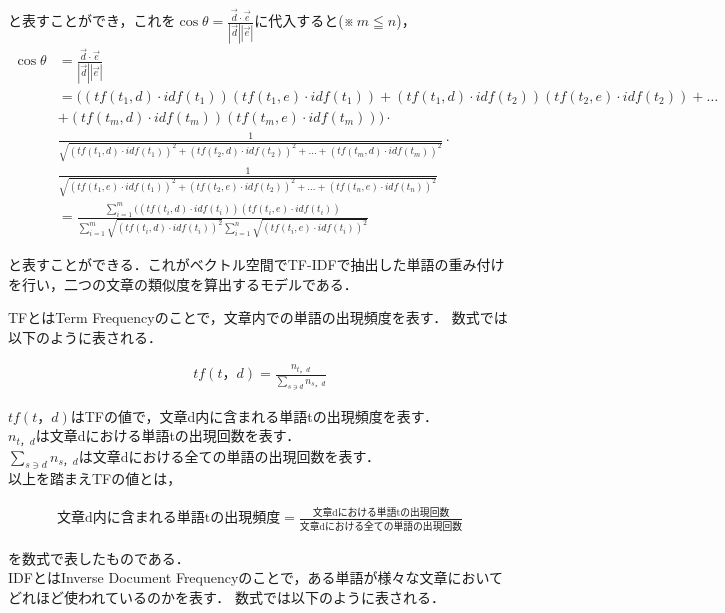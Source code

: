 と表すことができ，これを$ \cos \theta = \frac{\vec{d} \cdot \vec{e}}{|\vec{d}| |\vec{e}|} $に代入すると(※\,$ m \leqq n $)，
\begin{align}
\cos \theta &= \frac{\vec{d} \cdot \vec{e}}{|\vec{d}| |\vec{e}|} \nonumber \\
            &= ((tf(t_{1},d) \cdot idf(t_{1}))(tf(t_{1},e) \cdot idf(t_{1})) + (tf(t_{1},d) \cdot idf(t_{2}))(tf(t_{2},e) \cdot idf(t_{2})) + \ldots \nonumber \\
            &+ (tf(t_{m},d) \cdot idf(t_{m}))(tf(t_{m},e) \cdot idf(t_{m}))) \cdot \nonumber \\
            &\frac{1}{\sqrt{(tf(t_{1},d) \cdot idf(t_{1}))^2 + (tf(t_{2},d) \cdot idf(t_{2}))^2 + \ldots + (tf(t_{m},d) \cdot idf(t_{m}))^2}} \cdot \nonumber \\[2mm]
            &\frac{1}{\sqrt{(tf(t_{1},e) \cdot idf(t_{1}))^2 + (tf(t_{2},e) \cdot idf(t_{2}))^2 + \ldots + (tf(t_{n},e) \cdot idf(t_{n}))^2}} \nonumber \\[2mm]
            &= \frac{ \sum_{i=1}^{m} ((tf(t_{i},d) \cdot idf(t_{i}))(tf(t_{i},e) \cdot idf(t_{i}))}{\sum_{i=1}^{m} \sqrt{(tf(t_{i},d) \cdot idf(t_{i}))^2} \sum_{i=1}^{n} \sqrt{(tf(t_{i},e) \cdot idf(t_{i}))^2}} \nonumber
\end{align}

と表すことができる．これがベクトル空間でTF-IDFで抽出した単語の重み付けを行い，二つの文章の類似度を算出するモデルである．


\label{tech:tfidf}
TFとはTerm Frequencyのことで，文章内での単語の出現頻度を表す．
数式では以下のように表される．

\begin{align}
tf(t，d) = \frac{n_{t，d}}{\sum_{s \ni{d}}n_{s，d}} \nonumber
\end{align}

$ tf(t，d) $はTFの値で，文章d内に含まれる単語tの出現頻度を表す．\\
$ n_{t，d} $は文章dにおける単語tの出現回数を表す．\\
$ \sum_{s \ni{d}}n_{s，d} $は文章dにおける全ての単語の出現回数を表す．\\
以上を踏まえTFの値とは，

\begin{align}
\mbox{文章d内に含まれる単語tの出現頻度} = \frac{\mbox{文章dにおける単語tの出現回数}}{\mbox{文章dにおける全ての単語の出現回数}} \nonumber
\end{align}

を数式で表したものである．\\
IDFとはInverse Document Frequencyのことで，ある単語が様々な文章においてどれほど使われているのかを表す．
数式では以下のように表される．

